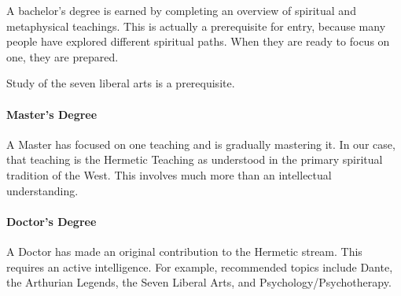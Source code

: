A bachelor's degree is earned by completing an overview of spiritual and metaphysical teachings. This is actually a prerequisite for entry, because many people have explored different spiritual paths. When they are ready to focus on one, they are prepared.

Study of the seven liberal arts is a prerequisite.

\paragraph{Master's Degree}


A Master has focused on one teaching and is gradually mastering it. In our case, that teaching is the Hermetic Teaching as understood in the primary spiritual tradition of the West. This involves much more than an intellectual understanding.

\paragraph{Doctor's Degree}


A Doctor has made an original contribution to the Hermetic stream. This requires an active intelligence. For example, recommended topics include Dante, the Arthurian Legends, the Seven Liberal Arts, and Psychology/Psychotherapy.



